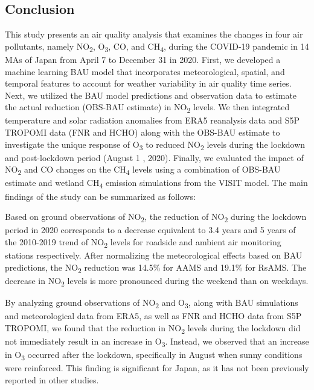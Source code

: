 \subsection{Conclusion} \label{chap4_conclusion}
This study presents an air quality analysis that examines the changes in four air pollutants, namely NO\textsubscript{2}, O\textsubscript{3}, CO, and CH\textsubscript{4}, during the COVID-19 pandemic in 14 MAs of Japan from April 7 to December 31 in 2020. First, we developed a machine learning BAU model that incorporates meteorological, spatial, and temporal features to account for weather variability in air quality time series. Next, we utilized the BAU model predictions and observation data to estimate the actual reduction (OBS-BAU estimate) in NO\textsubscript{2} levels. We then integrated temperature and solar radiation anomalies from ERA5 reanalysis data and S5P TROPOMI data (FNR and HCHO) along with the OBS-BAU estimate to investigate the unique response of O\textsubscript{3} to reduced NO\textsubscript{2} levels during the lockdown and post-lockdown period (August 1 , 2020). Finally, we evaluated the impact of NO\textsubscript{2} and CO changes on the CH\textsubscript{4} levels using a combination of OBS-BAU estimate and wetland CH\textsubscript{4} emission simulations from the VISIT model. The main findings of the study can be summarized as follows:\par
Based on ground observations of NO\textsubscript{2}, the reduction of NO\textsubscript{2} during the lockdown period in 2020 corresponds to a decrease equivalent to 3.4 years and 5 years of the 2010-2019 trend of NO\textsubscript{2} levels for roadside and ambient air monitoring stations respectively. After normalizing the meteorological effects based on BAU predictions, the NO\textsubscript{2} reduction was 14.5\% for AAMS and 19.1\% for RsAMS. The decrease in NO\textsubscript{2} levels is more pronounced during the weekend than on weekdays.\par
By analyzing ground observations of NO\textsubscript{2} and O\textsubscript{3}, along with BAU simulations and meteorological data from ERA5, as well as FNR and HCHO data from S5P TROPOMI, we found that the reduction in NO\textsubscript{2} levels during the lockdown did not immediately result in an increase in O\textsubscript{3}. Instead, we observed that an increase in O\textsubscript{3} occurred after the lockdown, specifically in August when sunny conditions were reinforced. This finding is significant for Japan, as it has not been previously reported in other studies.\par
